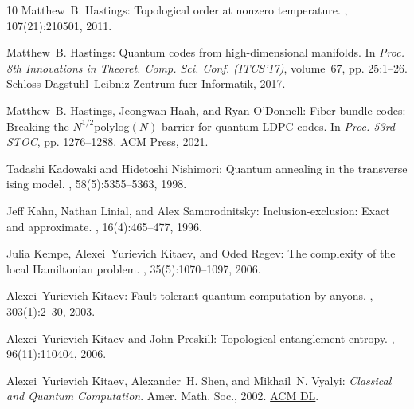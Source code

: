 \documentclass[11pt]{article}
\begin{document}
\begin{thebibliography}{10}
{\sc Matthew~B. Hastings}: Topological order at nonzero temperature.
, 107(21):210501, 2011.

{\sc Matthew~B. Hastings}: Quantum codes from high-dimensional manifolds.
\newblock In {\em Proc. 8th Innovations in Theoret. Comp. Sci. Conf.
  (ITCS'17)}, volume~67, pp. 25:1--26. Schloss Dagstuhl--Leibniz-Zentrum fuer
  Informatik, 2017.

{\sc Matthew~B. Hastings, Jeongwan Haah, and Ryan O'Donnell}: Fiber bundle
  codes: {B}reaking the {$N^{1/2}$polylog$(N)$} barrier for quantum {LDPC}
  codes.
\newblock In {\em Proc. 53rd STOC}, pp. 1276--1288. ACM Press, 2021.

{\sc Tadashi Kadowaki and Hidetoshi Nishimori}: Quantum annealing in the
  transverse ising model.
, 58(5):5355--5363, 1998.

{\sc Jeff Kahn, Nathan Linial, and Alex Samorodnitsky}: Inclusion-exclusion:
  {E}xact and approximate.
, 16(4):465--477, 1996.
\newblock [\epfmtdoi{10.1007/BF01271266}]

{\sc Julia Kempe, Alexei~Yurievich Kitaev, and Oded Regev}: The complexity of
  the local {H}amiltonian problem.
, 35(5):1070--1097, 2006.
\newblock [\epfmtdoi{10.1137/S0097539704445226}]

{\sc Alexei~Yurievich Kitaev}: Fault-tolerant quantum computation by anyons.
, 303(1):2--30, 2003.
\newblock [\epfmtdoi{10.1016/S0003-4916(02)00018-0}]

{\sc Alexei~Yurievich Kitaev and John Preskill}: Topological entanglement
  entropy.
, 96(11):110404, 2006.

{\sc Alexei~Yurievich Kitaev, Alexander~H. Shen, and Mikhail~N. Vyalyi}: {\em
  Classical and Quantum Computation}.
\newblock Amer. Math. Soc., 2002.
\newblock \href{https://dl.acm.org/doi/10.5555/863284}{ACM DL}.


\end{thebibliography}
\end{document}
